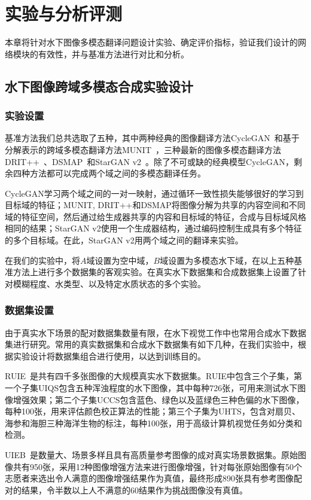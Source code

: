\chapter{实验与分析评测}\label{sec:experiment}
本章将针对水下图像多模态翻译问题设计实验、确定评价指标，验证我们设计的网络模块的有效性，并与基准方法进行对比和分析。

\section{水下图像跨域多模态合成实验设计}
\subsection{实验设置}
基准方法我们总共选取了五种，其中两种经典的图像翻译方法CycleGAN~\citep{zhu2017unpaired}和基于分解表示的跨域多模态翻译方法MUNIT~\citep{huang2018multimodal}，三种最新的图像多模态翻译方法DRIT++~\citep{lee2020drit++}、DSMAP~\citep{chang2020domain}和StarGAN v2~\cite{choi2020stargan}。除了不可或缺的经典模型CycleGAN，剩余四种方法都可以完成两个域之间的多模态翻译任务。

CycleGAN学习两个域之间的一对一映射，通过循环一致性损失能够很好的学习到目标域的特征；MUNIT, DRIT++和DSMAP将图像分解为共享的内容空间和不同域的特征空间，然后通过给生成器共享的内容和目标域的特征，合成与目标域风格相同的结果；StarGAN v2使用一个生成器结构，通过编码控制生成具有多个特征的多个目标域。在此，StarGAN v2用两个域之间的翻译来实验。

在我们的实验中，将$A$域设置为空中域，$B$域设置为多模态水下域，在以上五种基准方法上进行多个数据集的客观实验。在真实水下数据集和合成数据集上设置了针对模糊程度、水类型、以及特定水质状态的多个实验。

\subsection{数据集设置}
由于真实水下场景的配对数据集数量有限，在水下视觉工作中也常用合成水下数据集进行研究。常用的真实数据集和合成水下数据集有如下几种，在我们实验中，根据实验设计将数据集组合进行使用，以达到训练目的。

RUIE~\cite{liu2019real}是共有四千多张图像的大规模真实水下数据集。RUIE中包含三个子集，第一个子集UIQS包含五种浑浊程度的水下图像，其中每种726张，可用来测试水下图像增强效果；第二个子集UCCS包含蓝色、绿色以及蓝绿色三种色偏的水下图像，每种100张，用来评估颜色校正算法的性能；第三个子集为UHTS，包含对扇贝、海参和海胆三种海洋生物的标注，每种100张，用于高级计算机视觉任务如分类和检测。

UIEB~\cite{li2019underwater}是数量大、场景多样且具有高质量参考图像的成对真实场景数据集。原始图像共有950张，采用12种图像增强方法来进行图像增强，针对每张原始图像有50个志愿者来选出令人满意的图像增强结果作为真值，最终形成890张具有参考图像配对的结果，令半数以上人不满意的60结果作为挑战图像没有真值。

